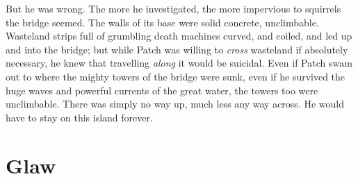 \documentclass[12pt]{book}
\begin{document}
 But he was wrong. The more he investigated, the more impervious to squirrels the bridge seemed. The walls of its base were solid concrete, unclimbable. Wasteland strips full of grumbling death machines curved, and coiled, and led up and into the bridge; but while Patch was willing to {\it cross} wasteland if absolutely necessary, he knew that travelling {\it along} it would be suicidal. Even if Patch swam out to where the mighty towers of the bridge were sunk, even if he survived the huge waves and powerful currents of the great water, the towers too were unclimbable. There was simply no way up, much less any way across. He would have to stay on this island forever.\par

\section{Glaw}
\end{document}
